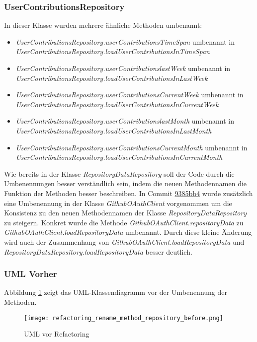 \subsubsection*{UserContributionsRepository}
In dieser Klasse wurden mehrere ähnliche Methoden umbenannt:
\begin{itemize}
	\item{\textit{UserContributionsRepository.userContributionsTimeSpan} umbenannt in \textit{UserContributionsRepository.loadUserContributionsInTimeSpan}}
	\item{\textit{UserContributionsRepository.userContributionslastWeek} umbenannt in \textit{UserContributionsRepository.loadUserContributionsInLastWeek}}
	\item{\textit{UserContributionsRepository.userContributionsCurrentWeek} umbenannt in \textit{UserContributionsRepository.loadUserContributionsInCurrentWeek}}
	\item{\textit{UserContributionsRepository.userContributionslastMonth} umbenannt in \textit{UserContributionsRepository.loadUserContributionsInLastMonth}}
	\item{\textit{UserContributionsRepository.userContributionsCurrentMonth} umbenannt in \textit{UserContributionsRepository.loadUserContributionsInCurrentMonth}}
\end{itemize}
Wie bereits in der Klasse \textit{RepositoryDataRepository} soll der Code durch die Umbenennungen besser verständlich sein, indem die neuen Methodennamen die Funktion der Methoden besser beschreiben.
\newline
In Commit \href{https://github.com/lukaspanni/OpenSourceStats/commit/9385bb4b9e20b5503e3ea72acd392185f0c533db} {9385bb4} wurde zusätzlich eine Umbenennung in der Klasse \textit{GithubOAuthClient} vorgenommen um die Konsistenz zu den neuen Methodennamen der Klasse \textit{RepositoryDataRepository} zu steigern.
Konkret wurde die Methode \textit{GithubOAuthClient.repositoryData} zu \textit{GithubOAuthClient.loadRepositoryData} umbenannt. Durch diese kleine Änderung wird auch der Zusammenhang von \textit{GithubOAuthClient.loadRepositoryData} und \textit{RepositoryDataRepository.loadRepositoryData} besser deutlich.

\subsubsection{UML Vorher}
Abbildung \ref{fig:RenameMethod_Refactoring_Before} zeigt das UML-Klassendiagramm vor der Umbenennung der Methoden.
\begin{figure}[h]
  \texttt{[image: refactoring\_rename\_method\_repository\_before.png]}
  \centering
  \caption{UML vor Refactoring}
  \label{fig:RenameMethod_Refactoring_Before}
\end{figure}

